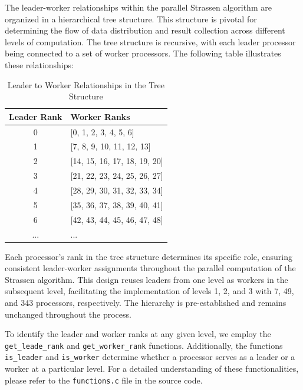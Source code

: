 \documentclass[12pt,a4paper]{article}
\begin{document}
The leader-worker relationships within the parallel Strassen algorithm are organized in a hierarchical tree structure. This structure is pivotal for determining the flow of data distribution and result collection across different levels of computation. The tree structure is recursive, with each leader processor being connected to a set of worker processors. The following table illustrates these relationships:

\begin{table}[htbp]
    \centering
    \begin{tabular}{cl}
        \toprule
        \textbf{Leader Rank} & \textbf{Worker Ranks} \\
        \midrule
        0 & [0, 1, 2, 3, 4, 5, 6] \\
        1 & [7, 8, 9, 10, 11, 12, 13] \\
        2 & [14, 15, 16, 17, 18, 19, 20] \\
        3 & [21, 22, 23, 24, 25, 26, 27] \\
        4 & [28, 29, 30, 31, 32, 33, 34] \\
        5 & [35, 36, 37, 38, 39, 40, 41] \\
        6 & [42, 43, 44, 45, 46, 47, 48] \\
        ... & ... \\
        \bottomrule
    \end{tabular}
    \caption{Leader to Worker Relationships in the Tree Structure}
    \label{tab:leader_worker_relationships}
\end{table}

Each processor's rank in the tree structure determines its specific role, ensuring consistent leader-worker assignments throughout the parallel computation of the Strassen algorithm. This design reuses leaders from one level as workers in the subsequent level, facilitating the implementation of levels 1, 2, and 3 with 7, 49, and 343 processors, respectively. The hierarchy is pre-established and remains unchanged throughout the process.

To identify the leader and worker ranks at any given level, we employ the \texttt{get\_leade\_rank} and \texttt{get\_worker\_rank} functions. Additionally, the functions \texttt{is\_leader} and \texttt{is\_worker} determine whether a processor serves as a leader or a worker at a particular level. For a detailed understanding of these functionalities, please refer to the \texttt{functions.c} file in the source code.
\end{document}

